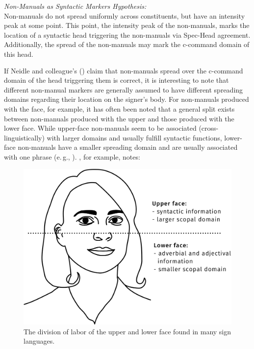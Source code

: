 \begin{exe}
\ex \textit{Non-Manuals as Syntactic Markers Hypothesis:}\\
Non-manuals do not spread uniformly across constituents, but have an intensity peak at some point. This point, the intensity peak of the non-manuals, marks the location of a syntactic head triggering the non-manuals via Spec-Head agreement. Additionally, the spread of the non-manuals may mark the c-command domain of this head. \label{nmasmh}
\end{exe}

\noindent If Neidle and colleague's (\citeyear{neidle2000syntax}) claim that non-manuals spread over the c-command domain of the head triggering them is correct, it is interesting to note that different non-manual markers are generally assumed to have different spreading domains regarding their location on the signer's body. For non-manuals produced with the face, for example, it has often been noted that a general split exists between non-manuals produced with the upper and those produced with the lower face. While upper-face non-manuals seem to be associated (cross-linguistically) with larger domains and usually fulfill syntactic functions, lower-face non-manuals have a smaller spreading domain and are usually associated with one phrase (e.\,g., \citealt{liddell1980american, coerts1992nonmanual, wilbur2000phonological, wilbur2003modality, brentari2002prosody}). \citet[249]{wilbur2009productive}, for example, notes: 

\begin{figure}[bt]
\centering
	\includegraphics[width=1.0\textwidth]{face.jpg}
	\caption{The division of labor of the upper and lower face found in many sign languages.}
	\label{upperlowerfacedivisionoflabour}
\end{figure}

